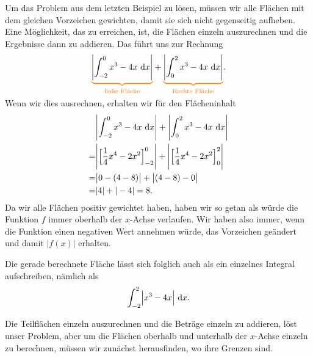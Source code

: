 \documentclass[../../main.tex]{subfiles}
\begin{document}
\begin{example}{}
    Um das Problem aus dem letzten Beispiel zu lösen, müssen wir alle Flächen mit dem gleichen Vorzeichen gewichten, damit sie sich nicht
    gegenseitig aufheben. Eine Möglichkeit, das zu erreichen, ist, die Flächen einzeln auszurechnen und die Ergebnisse
    dann zu addieren. Das führt uns zur Rechnung
    \[\colorbrace{\Biggl|\int_{-2}^0x^3-4x\diff x\Biggr|}{\text{linke Fläche}}+\colorbrace{\Biggl|\int_0^2x^3-4x\diff x\Biggr|}{\text{Rechte Fläche}}.\]
    Wenn wir dies ausrechnen, erhalten wir für den Flächeninhalt
    \begin{align*}
        &\Biggl|\int_{-2}^0x^3-4x\mathop{}\mathrm{d} x\Biggr|+\Biggl|\int_{0}^2x^3-4x\mathop{}\mathrm{d} x\Biggr|\\
        =&\Biggl|\Bigl[\frac{1}{4}x^4-2x^2\Bigr]_{-2}^0\Biggr|+\Biggl|\Bigl[\frac{1}{4}x^4-2x^2\Bigr]_{0}^2\Biggr|\\
        =&\bigl|0-(4-8)\bigr|+\bigl|(4-8)-0\bigr|\\
        =&|4|+|-4|=8.
    \end{align*}
    Da wir alle Flächen positiv gewichtet haben, haben wir so getan als würde die Funktion $f$ immer oberhalb der
    $x$-Achse verlaufen. Wir haben also immer, wenn die Funktion einen negativen Wert annehmen würde, das Vorzeichen
    geändert und damit $|f(x)|$ erhalten. 
    
    Die gerade berechnete Fläche lässt sich folglich auch als ein einzelnes Integral aufschreiben, 
    nämlich als 
    \[\int_{-2}^2\Bigl|x^3-4x\Bigr|\mathop{}\mathrm{d} x.\]
\end{example}
Die Teilflächen einzeln auszurechnen und die Beträge einzeln zu addieren, löst unser Problem, aber um die Flächen 
oberhalb und unterhalb der $x$-Achse einzeln zu berechnen, müssen wir zunächst herausfinden, wo ihre Grenzen sind.
\end{document}
